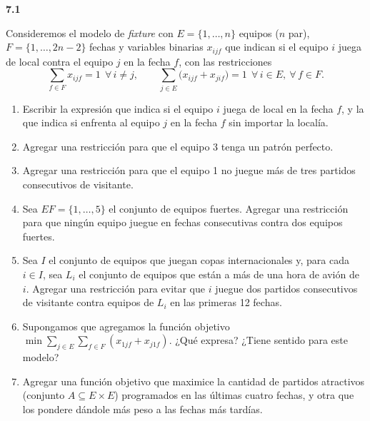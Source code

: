 \documentclass[11pt,a4paper]{article}
\newcommand{\ejercicio}[1]{\par\medskip\noindent\textbf{#1}\par\nopagebreak\smallskip}
\begin{document}
\ejercicio{7.1}
Consideremos el modelo de \emph{fixture} con $E = \{1,\dots,n\}$ equipos ($n$
par), $F = \{1,\dots,2n-2\}$ fechas y variables binarias $x_{ijf}$ que indican
si el equipo $i$ juega de local contra el equipo $j$ en la fecha $f$, con las
restricciones
\[
\sum_{f \in F} x_{ijf} = 1 \ \ \forall\, i \ne j, \qquad
\sum_{j \in E} \big( x_{ijf} + x_{jif} \big) = 1 \ \ \forall\, i \in E,\
\forall\, f \in F .
\]
\begin{enumerate}[itemsep=1pt]
  \item Escribir la expresión que indica si el equipo $i$ juega de local en la
  fecha $f$, y la que indica si enfrenta al equipo $j$ en la fecha $f$ sin
  importar la localía.
  \item Agregar una restricción para que el equipo 3 tenga un patrón perfecto.
  \item Agregar una restricción para que el equipo 1 no juegue más de tres
  partidos consecutivos de visitante.
  \item Sea $EF = \{1,\dots,5\}$ el conjunto de equipos fuertes. Agregar una
  restricción para que ningún equipo juegue en fechas consecutivas contra dos
  equipos fuertes.
  \item Sea $I$ el conjunto de equipos que juegan copas internacionales y, para
  cada $i \in I$, sea $L_i$ el conjunto de equipos que están a más de una hora
  de avión de $i$. Agregar una restricción para evitar que $i$ juegue dos
  partidos consecutivos de visitante contra equipos de $L_i$ en las primeras 12
  fechas.
  \item Supongamos que agregamos la función objetivo
  $\min \sum_{j \in E} \sum_{f \in F} (x_{1jf} + x_{j1f})$.
  ¿Qué expresa? ¿Tiene sentido para este modelo?
  \item Agregar una función objetivo que maximice la cantidad de partidos
  atractivos (conjunto $A \subseteq E \times E$) programados en las últimas
  cuatro fechas, y otra que los pondere dándole más peso a las fechas más
  tardías.
\end{enumerate}
\end{document}
